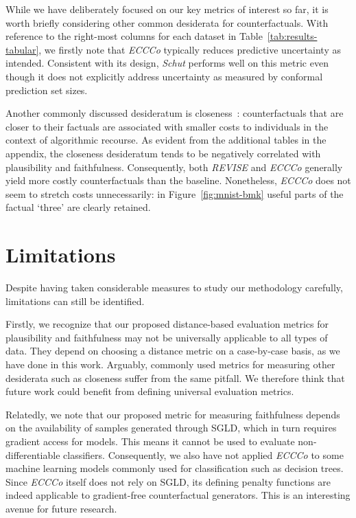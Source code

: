 \documentclass[letterpaper]{article} %
\begin{document}
While we have deliberately focused on our key metrics of interest so far, it is worth briefly considering other common desiderata for counterfactuals. With reference to the right-most columns for each dataset in Table~\ref{tab:results-tabular}, we firstly note that \textit{ECCCo} typically reduces predictive uncertainty as intended. Consistent with its design, \textit{Schut} performs well on this metric even though it does not explicitly address uncertainty as measured by conformal prediction set sizes. 

Another commonly discussed desideratum is closeness~\citep{wachter2017counterfactual}: counterfactuals that are closer to their factuals are associated with smaller costs to individuals in the context of algorithmic recourse. As evident from the additional tables in the appendix, the closeness desideratum tends to be negatively correlated with plausibility and faithfulness. Consequently, both \textit{REVISE} and \textit{ECCCo} generally yield more costly counterfactuals than the baseline. Nonetheless, \textit{ECCCo} does not seem to stretch costs unnecessarily: in Figure~\ref{fig:mnist-bmk} useful parts of the factual `three' are clearly retained.

\section{Limitations}

Despite having taken considerable measures to study our methodology carefully, limitations can still be identified. 

Firstly, we recognize that our proposed distance-based evaluation metrics for plausibility and faithfulness may not be universally applicable to all types of data. They depend on choosing a distance metric on a case-by-case basis, as we have done in this work. Arguably, commonly used metrics for measuring other desiderata such as closeness suffer from the same pitfall. We therefore think that future work could benefit from defining universal evaluation metrics. 

Relatedly, we note that our proposed metric for measuring faithfulness depends on the availability of samples generated through SGLD, which in turn requires gradient access for models. This means it cannot be used to evaluate non-differentiable classifiers. Consequently, we also have not applied \textit{ECCCo} to some machine learning models commonly used for classification such as decision trees. Since \textit{ECCCo} itself does not rely on SGLD, its defining penalty functions are indeed applicable to gradient-free counterfactual generators. This is an interesting avenue for future research.
\end{document}

